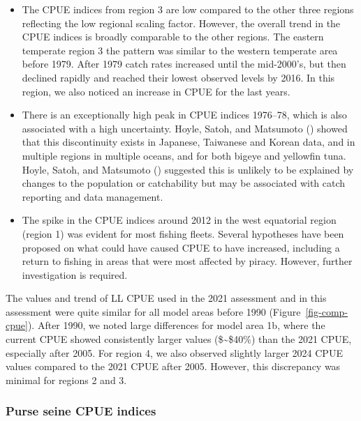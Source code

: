 \documentclass[
]{scrartcl}
\begin{document}
\begin{itemize}
\item
  The CPUE indices from region 3 are low compared to the other three
  regions reflecting the low regional scaling factor. However, the
  overall trend in the CPUE indices is broadly comparable to the other
  regions. The eastern temperate region 3 the pattern was similar to the
  western temperate area before 1979. After 1979 catch rates increased
  until the mid-2000's, but then declined rapidly and reached their
  lowest observed levels by 2016. In this region, we also noticed an
  increase in CPUE for the last years.
\item
  There is an exceptionally high peak in CPUE indices 1976--78, which is
  also associated with a high uncertainty. Hoyle, Satoh, and Matsumoto
  () showed that
  this discontinuity exists in Japanese, Taiwanese and Korean data, and
  in multiple regions in multiple oceans, and for both bigeye and
  yellowfin tuna. Hoyle, Satoh, and Matsumoto
  () suggested this
  is unlikely to be explained by changes to the population or
  catchability but may be associated with catch reporting and data
  management.
\item
  The spike in the CPUE indices around 2012 in the west equatorial
  region (region 1) was evident for most fishing fleets. Several
  hypotheses have been proposed on what could have caused CPUE to have
  increased, including a return to fishing in areas that were most
  affected by piracy. However, further investigation is required.
\end{itemize}

The values and trend of LL CPUE used in the 2021 assessment and in this
assessment were quite similar for all model areas before 1990
(Figure~\ref{fig-comp-cpue}). After 1990, we noted large differences for
model area 1b, where the current CPUE showed consistently larger values
(\$\sim\$40\%) than the 2021 CPUE, especially after 2005. For region 4,
we also observed slightly larger 2024 CPUE values compared to the 2021
CPUE after 2005. However, this discrepancy was minimal for regions 2 and
3.

\subsubsection{Purse seine CPUE indices}\label{purse-seine-cpue-indices}
\end{document}
